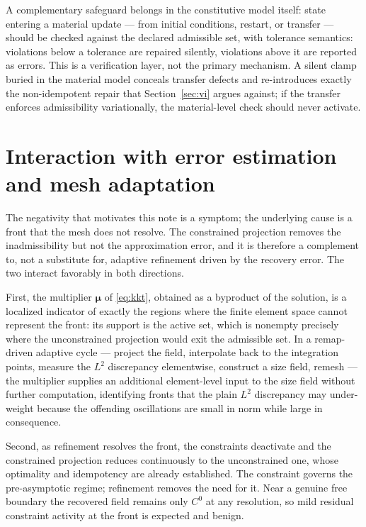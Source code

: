\documentclass[11pt]{article}
\newcommand{\bs}[1]{\boldsymbol{#1}}
\begin{document}
A complementary safeguard belongs in the constitutive model itself:
state entering a material update --- from initial conditions, restart, or
transfer --- should be checked against the declared admissible set, with
tolerance semantics: violations below a tolerance are repaired silently,
violations above it are reported as errors. This is a verification
layer, not the primary mechanism. A silent clamp buried in the material
model conceals transfer
defects and re-introduces exactly the non-idempotent repair that
Section~\ref{sec:vi} argues against; if the transfer enforces
admissibility variationally, the material-level check should never
activate.

\section{Interaction with error estimation and mesh adaptation}
\label{sec:adaptivity}

The negativity that motivates this note is a symptom; the underlying
cause is a front that the mesh does not resolve. The constrained projection removes the
inadmissibility but not the approximation error, and it is therefore a
complement to, not a substitute for, adaptive refinement driven by the
recovery error. The two interact favorably in both directions.

First, the multiplier $\bs{\mu}$ of \eqref{eq:kkt}, obtained as a
byproduct of the solution, is a localized indicator of exactly the
regions where the finite element space cannot represent the front: its support is the active set, which is nonempty
precisely where the unconstrained projection would exit the admissible
set. In a remap-driven adaptive cycle --- project the field, interpolate
back to the integration points, measure the $L^2$ discrepancy elementwise,
construct a size field, remesh --- the multiplier supplies an additional
element-level input to the size field without further computation,
identifying fronts that the plain $L^2$ discrepancy may under-weight
because the offending oscillations are small in norm while large in
consequence.

Second, as refinement resolves the
front, the constraints deactivate and the constrained projection reduces
continuously to the unconstrained one, whose optimality and idempotency
are already established. The constraint governs the pre-asymptotic
regime; refinement removes the need for it. Near a genuine free boundary
the recovered field remains only $C^0$ at any resolution, so mild
residual constraint activity at the front is expected and benign.
\end{document}
